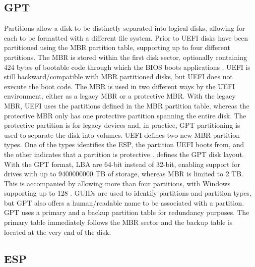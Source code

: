 \subsection{\acf{GPT}}

Partitions allow a disk to be distinctly separated into logical disks, allowing for each to be formatted with a different file system.
Prior to \ac{UEFI} disks have been partitioned using the \ac{MBR} partition table, supporting up to four different partitions.
The \ac{MBR} is stored within the first disk sector, optionally containing 424 bytes of bootable code through which the \ac{BIOS} boots applications \cite[Section 13.3.1]{uefi-spec}.
\ac{UEFI} is still backward\-/compatible with \ac{MBR} partitioned disks, but \ac{UEFI} does not execute the boot code.
The \ac{MBR} is used in two different ways by the \ac{UEFI} environment, either as a legacy \ac{MBR} or a protective \ac{MBR}.
With the legacy \ac{MBR}, \ac{UEFI} uses the partitions defined in the \ac{MBR} partition table, whereas the protective \ac{MBR} only has one protective partition spanning the entire disk.
The protective partition is for legacy devices and, in practice, \ac{GPT} partitioning is used to separate the disk into volumes.
\ac{UEFI} defines two new \ac{MBR} partition types.
One of the types identifies the \ac{ESP}, the partition \ac{UEFI} boots from, and the other indicates that a partition is protective \cite[Section 5]{uefi-spec}.
\cite[Section 5]{uefi-spec} defines the \ac{GPT} disk layout. With the \ac{GPT} format, \ac{LBA} are 64-bit instead of 32-bit, enabling support for drives with up to 9400000000 \ac{TB} of storage, whereas \ac{MBR} is limited to 2 \ac{TB}.
This is accompanied by allowing more than four partitions, with Windows supporting up to 128 \cite{microsoft-windows-and-gpt-faq}.
\acp{GUID} are used to identify partitions and partition types, but \ac{GPT} also offers a human\-/readable name to be associated with a partition.
\ac{GPT} uses a primary and a backup partition table for redundancy purposes.
The primary table immediately follows the \ac{MBR} sector and the backup table is located at the very end of the disk.

\subsection{\acf{ESP}}

